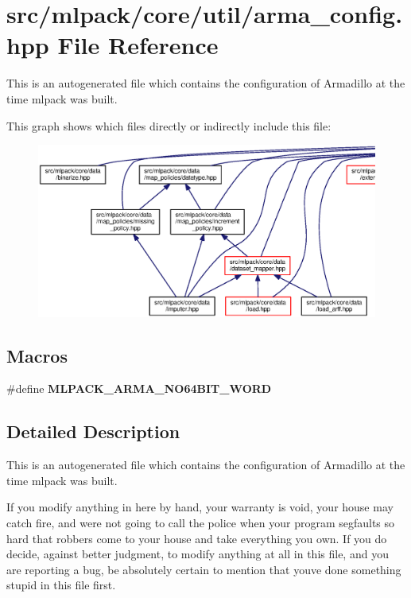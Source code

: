 \section{src/mlpack/core/util/arma\+\_\+config.hpp File Reference}
\label{arma__config_8hpp}


This is an autogenerated file which contains the configuration of Armadillo at the time mlpack was built.  


This graph shows which files directly or indirectly include this file\+:
\nopagebreak
\begin{figure}[H]
\begin{center}
\leavevmode
\includegraphics[width=350pt]{arma__config_8hpp__dep__incl}
\end{center}
\end{figure}
\subsection*{Macros}
\begin{DoxyCompactItemize}
\item 
\#define {\bf M\+L\+P\+A\+C\+K\+\_\+\+A\+R\+M\+A\+\_\+\+N\+O64\+B\+I\+T\+\_\+\+W\+O\+RD}
\end{DoxyCompactItemize}


\subsection{Detailed Description}
This is an autogenerated file which contains the configuration of Armadillo at the time mlpack was built. 

If you modify anything in here by hand, your warranty is void, your house may catch fire, and we\textquotesingle{}re not going to call the police when your program segfaults so hard that robbers come to your house and take everything you own. If you do decide, against better judgment, to modify anything at all in this file, and you are reporting a bug, be absolutely certain to mention that you\textquotesingle{}ve done something stupid in this file first.

